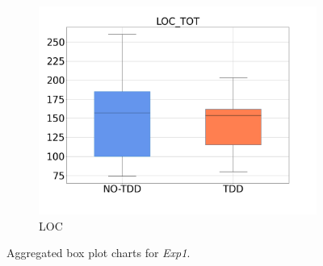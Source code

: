 \begin{figure}[H]
\begin{subfigure}{0.33\textwidth}
        \includegraphics[width=\linewidth]{figures/box_plots/task1_2/LOC.png}
        \caption{LOC}
        \label{bp_task1_2_loc}
    \end{subfigure}
    \caption{Aggregated box plot charts for \textit{Exp1}.}
    \label{box_plots_task1_2}
\end{figure}


